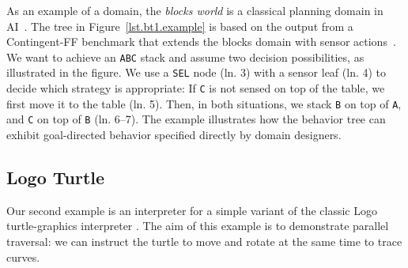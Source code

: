 \documentclass{sig-alternate}
\newcommand{\CEU}{\textsc{C\'{e}u}\xspace}
\newcommand{\code}[1] {{\small{\texttt{#1}}}}
\begin{document}
As an example of a domain, the \emph{blocks world} is a classical planning 
domain in AI~\cite{slaney2001blocks}.
%
The tree in Figure~\ref{lst.bt1.example} is based on the output from a
Contingent-FF benchmark that extends the blocks domain with sensor 
actions~\cite{hoffmann2005contingent}.
%
%
We want to achieve an \code{ABC} stack and assume two decision possibilities, 
as illustrated in the figure.
%
We use a \code{SEL} node (ln. 3) with a sensor leaf (ln. 4) to decide which 
strategy is appropriate:
If \code{C} is not sensed on top of the table, we first move it to the table 
(ln. 5).
Then, in both situations, we stack \code{B} on top of \code{A}, and \code{C} on 
top of \code{B} (ln. 6--7).
%
%
The example illustrates how the behavior tree can exhibit goal-directed 
behavior specified directly by domain designers.
%

\subsection{Logo Turtle}
\label{sec.apps.turtle}

Our second example is an interpreter for a simple variant of the classic Logo
turtle-graphics interpreter \cite{papert.logo}.
The aim of this example is to demonstrate parallel traversal:
we can instruct the turtle to move and rotate at the same time to trace curves.

\end{document}
